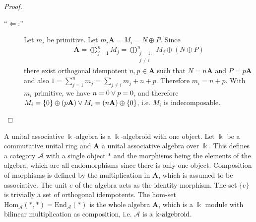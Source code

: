 \begin{proof}[Proof\nopunct]
\begin{subproof}
\begin{description}
\item[``$\Leftarrow$:''] Let $m_{i}$ be primitive. Let $m_{i}\mathbf{A} = M_{i} = N \oplus P$. Since
\begin{align*}
\mathbf{A} = \bigoplus_{j=1}^{n} M_{j} = \bigoplus_{\begin{smallmatrix}j=1,\\ j \neq i\end{smallmatrix}}^{n} M_{j} \oplus (N \oplus P)
\end{align*}
there exist orthogonal idempotent $n, p \in \mathbf{A}$ such that $N = n\mathbf{A}$ and $P = p\mathbf{A}$ and also
$1 = \sum_{j=1}^{n} m_{j} = \sum_{j\neq i} m_{j} + n + p$. Therefore $m_{i} = n + p$. With $m_{i}$ primitive, we have
$n = 0 \vee p = 0$, and therefore $M_{i} = \{0\} \oplus (p\mathbf{A}) \vee M_{i} = (n\mathbf{A}) \oplus \{0\}$, i.e. $M_{i}$ is indecomposable.
\end{description}
\end{subproof}
\end{proof}

A unital associative $\Bbbk$-algebra is a $\Bbbk$-algebroid with one object.
Let $\Bbbk$ be a commutative unital ring and $\mathbf{A}$ a unital associative algebra over $\Bbbk$. This defines a category $\mathcal{A}$
with a single object $\ast$ and the morphisms being the elements of the algebra, which are all endomorphisms since there is only one object.
Composition of morphisms is defined by the multiplication in $\mathbf{A}$, which is assumed to be associative.
The unit $e$ of the algebra acts as the identity morphism. The set $\{ e \}$ is trivially a set of orthogonal idempotents.
The hom-set $\mathrm{Hom}_{\mathcal{A}}(\ast,\ast) = \mathrm{End}_{\mathcal{A}}(\ast)$ is the whole algebra $\mathbf{A}$, which is
a $\Bbbk$ module with bilinear multiplication as composition, i.e. $\mathcal{A}$ is a $\Bbbk\textnormal{-}\mathrm{algebroid}$.

